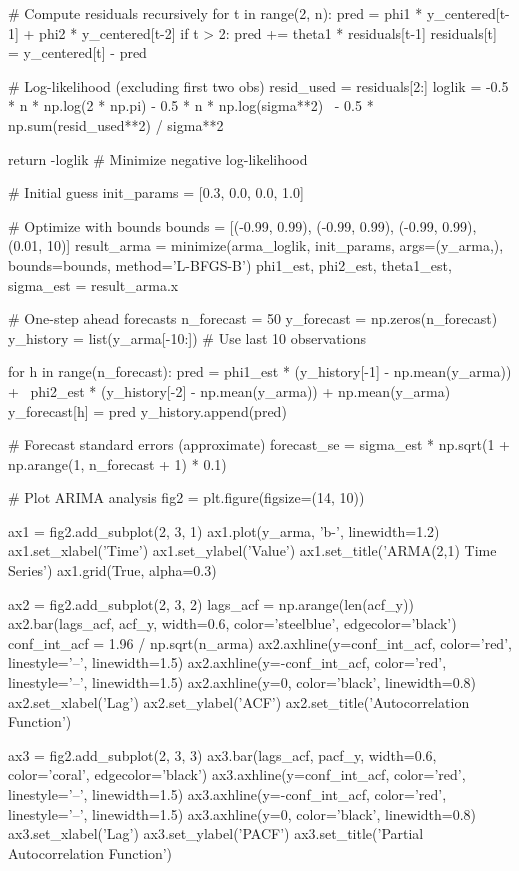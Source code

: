 \documentclass[a4paper, 11pt]{article}
\begin{document}
\begin{pycode}
    # Compute residuals recursively
    for t in range(2, n):
        pred = phi1 * y_centered[t-1] + phi2 * y_centered[t-2]
        if t > 2:
            pred += theta1 * residuals[t-1]
        residuals[t] = y_centered[t] - pred

    # Log-likelihood (excluding first two obs)
    resid_used = residuals[2:]
    loglik = -0.5 * n * np.log(2 * np.pi) - 0.5 * n * np.log(sigma**2) \
             - 0.5 * np.sum(resid_used**2) / sigma**2

    return -loglik  # Minimize negative log-likelihood

# Initial guess
init_params = [0.3, 0.0, 0.0, 1.0]

# Optimize with bounds
bounds = [(-0.99, 0.99), (-0.99, 0.99), (-0.99, 0.99), (0.01, 10)]
result_arma = minimize(arma_loglik, init_params, args=(y_arma,),
                       bounds=bounds, method='L-BFGS-B')
phi1_est, phi2_est, theta1_est, sigma_est = result_arma.x

# One-step ahead forecasts
n_forecast = 50
y_forecast = np.zeros(n_forecast)
y_history = list(y_arma[-10:])  # Use last 10 observations

for h in range(n_forecast):
    pred = phi1_est * (y_history[-1] - np.mean(y_arma)) + \
           phi2_est * (y_history[-2] - np.mean(y_arma)) + np.mean(y_arma)
    y_forecast[h] = pred
    y_history.append(pred)

# Forecast standard errors (approximate)
forecast_se = sigma_est * np.sqrt(1 + np.arange(1, n_forecast + 1) * 0.1)

# Plot ARIMA analysis
fig2 = plt.figure(figsize=(14, 10))

ax1 = fig2.add_subplot(2, 3, 1)
ax1.plot(y_arma, 'b-', linewidth=1.2)
ax1.set_xlabel('Time')
ax1.set_ylabel('Value')
ax1.set_title('ARMA(2,1) Time Series')
ax1.grid(True, alpha=0.3)

ax2 = fig2.add_subplot(2, 3, 2)
lags_acf = np.arange(len(acf_y))
ax2.bar(lags_acf, acf_y, width=0.6, color='steelblue', edgecolor='black')
conf_int_acf = 1.96 / np.sqrt(n_arma)
ax2.axhline(y=conf_int_acf, color='red', linestyle='--', linewidth=1.5)
ax2.axhline(y=-conf_int_acf, color='red', linestyle='--', linewidth=1.5)
ax2.axhline(y=0, color='black', linewidth=0.8)
ax2.set_xlabel('Lag')
ax2.set_ylabel('ACF')
ax2.set_title('Autocorrelation Function')

ax3 = fig2.add_subplot(2, 3, 3)
ax3.bar(lags_acf, pacf_y, width=0.6, color='coral', edgecolor='black')
ax3.axhline(y=conf_int_acf, color='red', linestyle='--', linewidth=1.5)
ax3.axhline(y=-conf_int_acf, color='red', linestyle='--', linewidth=1.5)
ax3.axhline(y=0, color='black', linewidth=0.8)
ax3.set_xlabel('Lag')
ax3.set_ylabel('PACF')
ax3.set_title('Partial Autocorrelation Function')


\end{pycode}
\end{document}
